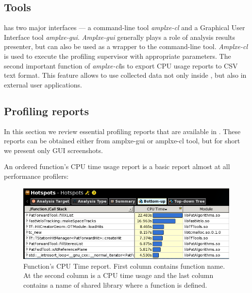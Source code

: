 \documentclass[a4paper]{jpconf}
\begin{document}
\subsection{Tools}

\amp has two major interfaces --- a command-line tool {\it amplxe-cl} and a Graphical User Interface 
tool {\it amplxe-gui}. {\it Amplxe-gui} generally plays a role of analysis results presenter, but can also be used as 
a wrapper to the  command-line tool. {\it Amplxe-cl} is used to execute the profiling supervisor with appropriate 
parameters.  The second important function of {\it amplxe-cl}is to export CPU usage reports to CSV text format. 
This feature allows to use collected data not only inside \amp, but also in external user applications. 

\subsection{Profiling reports}

In this section we review essential profiling reports that are available in \amp. These reports can be obtained either 
from amplxe-gui or amplxe-cl tool, but for short we present only GUI screenshots.

An ordered function’s CPU time usage report is a basic report almost at all performance profilers:

\begin{figure}[H]
\begin{minipage}{\textwidth}
\includegraphics[width=\textwidth]{figs/fig01.png}
\caption{\label{fig01}Function’s CPU Time report. First column contains function name. At the second column is a CPU 
time usage and the last column contains a name of shared library where a function is defined.}
\end{minipage}
\end{figure}
\end{document}
